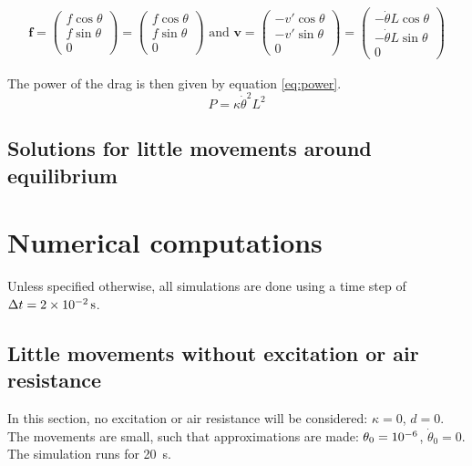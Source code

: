 \documentclass[a4paper,12pt,twoside]{article}
\begin{document}
\begin{align*}
	\mathbf{f} =
	\begin{pmatrix}
		f\cos\theta \\
		f\sin\theta \\
		0
	\end{pmatrix}
	= \begin{pmatrix}
		f\cos\theta \\
		f\sin\theta \\
		0
	\end{pmatrix}
	\text{ and }
	\mathbf{v} =
	\begin{pmatrix}
		-v'\cos\theta \\
		-v'\sin\theta \\
		0
	\end{pmatrix}
	= \begin{pmatrix}
		-\dot{\theta}L\cos\theta \\
		-\dot{\theta}L\sin\theta \\
		0
	\end{pmatrix}
\end{align*}

The power of the drag is then given by equation \ref{eq:power}.
\begin{equation}
	P = \kappa\dot{\theta}^2 L^2
	\label{eq:power}
\end{equation}


\subsection{Solutions for little movements around equilibrium}\label{sec:sol-analytique}
\section{Numerical computations}

Unless specified otherwise, all simulations are done using a time step of $\Delta t = \SI{2d-2}{\s}$.

\subsection{Little movements without excitation or air resistance}
In this section, no excitation or air resistance will be considered: $\kappa = 0$, $d = 0$.
The movements are small, such that approximations are made: $\theta_0 = \num{d-6}$, $\dot{\theta}_0 = 0$.
The simulation runs for \SI{20}{\second}.
\end{document}
